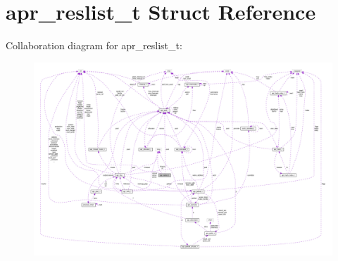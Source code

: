 \hypertarget{structapr__reslist__t}{}\section{apr\+\_\+reslist\+\_\+t Struct Reference}
\label{structapr__reslist__t}


Collaboration diagram for apr\+\_\+reslist\+\_\+t\+:
\nopagebreak
\begin{figure}[H]
\begin{center}
\leavevmode
\includegraphics[width=350pt]{structapr__reslist__t__coll__graph}
\end{center}
\end{figure}
